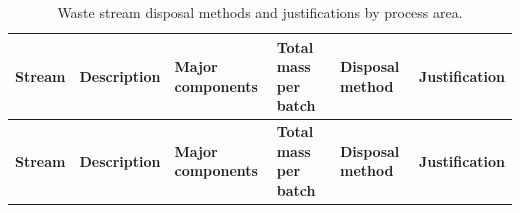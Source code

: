 \documentclass[a4paper]{article}
\begin{document}
\pagestyle{empty}

\setlength{\LTleft}{0pt}
\setlength{\LTright}{0pt}
\setlength{\tabcolsep}{3pt}
\footnotesize
\begin{longtable}{|>{\raggedright\arraybackslash}p{}|>{\raggedright\arraybackslash}p{}|>{\raggedright\arraybackslash}p{}|>{\raggedright\arraybackslash}p{}|>{\raggedright\arraybackslash}p{}|>{\raggedright\arraybackslash}p{}|}
        \caption{Waste stream disposal methods and justifications by process area.}
        \label{tab:waste_stream_disposal_routes_landscape}                                                                                                                                                                                                                                                                                                                                                                                                                                                                                                                                                                                                                                                            \\
        \hline
        \textbf{Stream} & \textbf{Description}                                 & \textbf{Major components}            & \textbf{Total mass per batch}                                 & \textbf{Disposal method}                                                            & \textbf{Justification}                                                                                                                                                                                                                                                                                                                                                                                                                  \\
        \hline
        \endfirsthead
        \hline
        \textbf{Stream} & \textbf{Description}                                 & \textbf{Major components}            & \textbf{Total mass per batch}                                 & \textbf{Disposal method}                                                            & \textbf{Justification}                                                                                                                                                                                                                                                                                                                                                                                                                  \\

\end{longtable}
\end{document}
